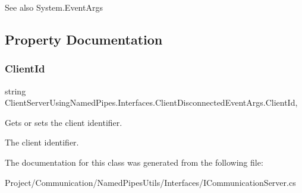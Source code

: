 \begin{DoxySeeAlso}{See also}
System.\+Event\+Args


\end{DoxySeeAlso}


\subsection{Property Documentation}
\mbox{\label{class_client_server_using_named_pipes_1_1_interfaces_1_1_client_disconnected_event_args_a7aa5e7a6eab6f1f6f39ece0829c417e7}} 
\subsubsection{\texorpdfstring{Client\+Id}{ClientId}}
{\footnotesize\ttfamily string Client\+Server\+Using\+Named\+Pipes.\+Interfaces.\+Client\+Disconnected\+Event\+Args.\+Client\+Id\hspace{0.3cm}{\ttfamily [get]}, {\ttfamily [set]}}



Gets or sets the client identifier. 

The client identifier.

The documentation for this class was generated from the following file\+:\begin{DoxyCompactItemize}
\item 
Project/\+Communication/\+Named\+Pipes\+Utils/\+Interfaces/I\+Communication\+Server.\+cs\end{DoxyCompactItemize}
